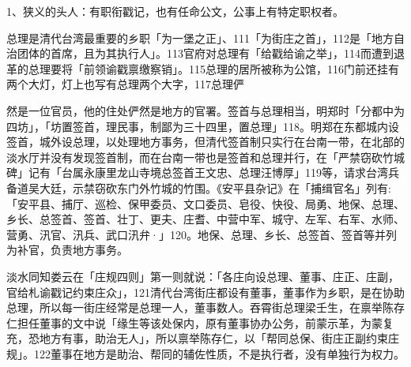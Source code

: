 1、狭义的头人：有职衔戳记，也有任命公文，公事上有特定职权者。


\begin{BookQuote}
总理是清代台湾最重要的乡职「为一堡之正」、111「为街庄之首」，112是「地方自治团体的首席，且为其执行人」。113官府对总理有「给戳给谕之举」，114而遭到退革的总理要将「前领谕戳禀缴察销」。115总理的居所被称为公馆，116门前还挂有两个大灯，灯上也写有总理两个大字，117总理俨
\end{BookQuote}

\vfill
\begin{BookNotes}
\end{BookNotes}

\noindent 然是一位官员，他的住处俨然是地方的官署。签首与总理相当，明郑时「分都中为四坊」，「坊置签首，理民事，制鄙为三十四里，置总理」118。明郑在东都城内设签首，城外设总理，以处理地方事务，但清代签首制只实行在台南一带，在北部的淡水厅并没有发现签首制，而在台南一带也是签首和总理并行，在「严禁窃砍竹城碑」记有「台属永康里龙山寺境总签首王文忠、总理汪博厚」119等，请求台湾兵备道吴大廷，示禁窃砍东门外竹城的竹围。《安平县杂记》在「捕缉官名」列有:「安平县、捕厅、巡检、保甲委员、文口委员、皂役、快役、局勇、地保、总理、乡长、总签首、签首、壮丁、更夫、庄耆、中营中军、城守、左军、右军、水师、营勇、汛官、汛兵、武口汛弁·」120。地保、总理、乡长、总签首、签首等并列为补官，负责地方事务。


\noindent 淡水同知娄云在「庄规四则」第一则就说：「各庄向设总理、董事、庄正、庄副，官给札谕戳记约束庄众」，121清代台湾街庄都设有董事，董事作为乡职，是在协助总理，所以每一街庄经常是总理一人，董事数人。吞霄街总理梁壬生，在禀举陈存仁担任董事的文中说「缘生等该处保内，原有董事协办公务，前蒙示革，为蒙复充，恐地方有事，助治无人」，所以禀举陈存仁，以「帮同总保、街庄正副约束庄规」。122董事在地方是助治、帮同的辅佐性质，不是执行者，没有单独行为权力。


